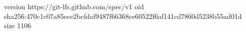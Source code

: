 version https://git-lfs.github.com/spec/v1
oid sha256:470c1c07a85ece2bcfdaf9487f66368ce60522f6af141cd7860d5238b55ad01d
size 1106
